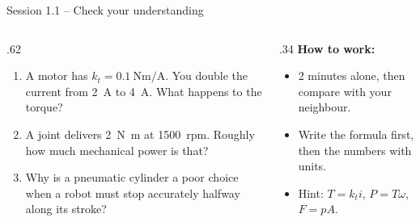 \documentclass[aspectratio=169,10pt]{beamer}
\begin{document}
\begin{frame}{Session 1.1 -- Check your understanding}
\begin{columns}[T]
\begin{column}{.62\textwidth}
\begin{keybox}
\begin{enumerate}\setlength\itemsep{6pt}
\item A motor has $k_t=\SI{0.1}{\newton\metre\per\ampere}$. You double the current from \SI{2}{\ampere} to \SI{4}{\ampere}. What happens to the torque?
\item A joint delivers \SI{2}{\newton\metre} at \SI{1500}{rpm}. Roughly how much mechanical power is that?
\item Why is a pneumatic cylinder a poor choice when a robot must stop accurately halfway along its stroke?
\end{enumerate}
\end{keybox}
\end{column}
\begin{column}{.34\textwidth}
\small
\textbf{How to work:}
\begin{itemize}
\item 2 minutes alone, then compare with your neighbour.
\item Write the formula first, then the numbers with units.
\item Hint: $T=k_t i$, $P=T\omega$, $F=pA$.
\end{itemize}
\end{column}
\end{columns}
\end{frame}
\end{document}

